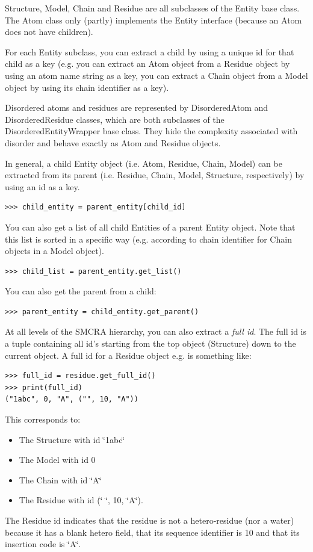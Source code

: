 \documentclass{report}
\begin{document}
Structure, Model, Chain and Residue are all subclasses of the Entity base class.
The Atom class only (partly) implements the Entity interface (because an Atom
does not have children).

For each Entity subclass, you can extract a child by using a unique id for that
child as a key (e.g. you can extract an Atom object from a Residue object by
using an atom name string as a key, you can extract a Chain object from a Model
object by using its chain identifier as a key).

Disordered atoms and residues are represented by DisorderedAtom and DisorderedResidue
classes, which are both subclasses of the DisorderedEntityWrapper base class.
They hide the complexity associated with disorder and behave exactly as Atom
and Residue objects.

In general, a child Entity object (i.e. Atom, Residue, Chain, Model) can be
extracted from its parent (i.e. Residue, Chain, Model, Structure, respectively)
by using an id as a key.

\begin{verbatim}
>>> child_entity = parent_entity[child_id]
\end{verbatim}

You can also get a list of all child Entities of a parent Entity object. Note
that this list is sorted in a specific way (e.g. according to chain identifier
for Chain objects in a Model object).

\begin{verbatim}
>>> child_list = parent_entity.get_list()
\end{verbatim}

You can also get the parent from a child:
\begin{verbatim}
>>> parent_entity = child_entity.get_parent()
\end{verbatim}

At all levels of the SMCRA hierarchy, you can also extract a \emph{full id}.
The full id is a tuple containing all id's starting from the top object (Structure)
down to the current object. A full id for a Residue object e.g. is something
like:

\begin{verbatim}
>>> full_id = residue.get_full_id()
>>> print(full_id)
("1abc", 0, "A", ("", 10, "A"))
\end{verbatim}

This corresponds to:

\begin{itemize}
\item The Structure with id \char`\"{}1abc\char`\"{}
\item The Model with id 0
\item The Chain with id \char`\"{}A\char`\"{}
\item The Residue with id (\char`\"{} \char`\"{}, 10, \char`\"{}A\char`\"{}).
\end{itemize}
The Residue id indicates that the residue is not a hetero-residue (nor a water)
because it has a blank hetero field, that its sequence identifier is 10 and
that its insertion code is \char`\"{}A\char`\"{}.
\end{document}
